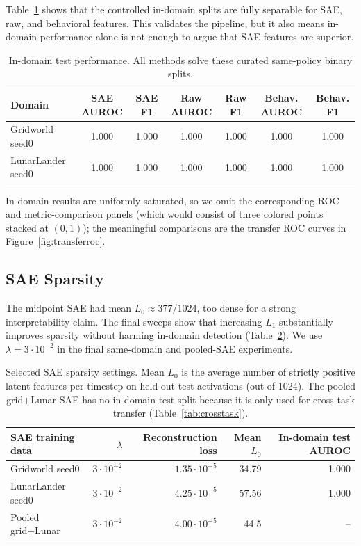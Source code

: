 \documentclass[11pt]{article}
\newcommand{\auroc}{AUROC}
\newcommand{\fone}{F1}
\begin{document}
Table~\ref{tab:indomain} shows that the controlled in-domain splits are fully separable for SAE, raw, and behavioral features. This validates the pipeline, but it also means in-domain performance alone is not enough to argue that SAE features are superior.

\begin{table}[H]
\centering
\caption{In-domain test performance. All methods solve these curated same-policy binary splits.}
\label{tab:indomain}
\small
\begin{tabular}{lcccccc}
\toprule
Domain & SAE \auroc{} & SAE \fone{} & Raw \auroc{} & Raw \fone{} & Behav. \auroc{} & Behav. \fone{}\\
\midrule
Gridworld seed0 & 1.000 & 1.000 & 1.000 & 1.000 & 1.000 & 1.000\\
LunarLander seed0 & 1.000 & 1.000 & 1.000 & 1.000 & 1.000 & 1.000\\
\bottomrule
\end{tabular}
\end{table}

In-domain results are uniformly saturated, so we omit the corresponding ROC and metric-comparison panels (which would consist of three colored points stacked at $(0,1)$); the meaningful comparisons are the transfer ROC curves in Figure~\ref{fig:transferroc}.

\subsection{SAE Sparsity}

The midpoint SAE had mean $L_0 \approx 377/1024$, too dense for a strong interpretability claim. The final sweeps show that increasing $L_1$ substantially improves sparsity without harming in-domain detection (Table~\ref{tab:sparsity}). We use $\lambda=3\cdot10^{-2}$ in the final same-domain and pooled-SAE experiments.

\begin{table}[H]
\centering
\caption{Selected SAE sparsity settings. Mean $L_0$ is the average number of strictly positive latent features per timestep on held-out test activations (out of 1024). The pooled grid+Lunar SAE has no in-domain test split because it is only used for cross-task transfer (Table~\ref{tab:crosstask}).}
\label{tab:sparsity}
\begin{tabular}{lrrrr}
\toprule
SAE training data & $\lambda$ & Reconstruction loss & Mean $L_0$ & In-domain test \auroc{}\\
\midrule
Gridworld seed0 & $3\cdot10^{-2}$ & $1.35\cdot10^{-5}$ & 34.79 & 1.000\\
LunarLander seed0 & $3\cdot10^{-2}$ & $4.25\cdot10^{-5}$ & 57.56 & 1.000\\
Pooled grid+Lunar & $3\cdot10^{-2}$ & $4.00\cdot10^{-5}$ & 44.5 & --\\
\bottomrule
\end{tabular}
\end{table}
\end{document}
